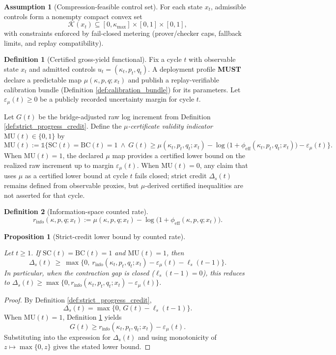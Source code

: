 \documentclass[11pt,a4paper]{article}
\newcommand{\MUST}{\textbf{MUST}}
\newcommand{\DependsOn}[1]{\par\noindent{\footnotesize\texttt{DependsOn: }\nolinkurl{#1}}\par}
\newcommand{\ind}{\mathds{1}}
\newcommand{\eps}{\varepsilon}
\newcommand{\cK}{\mathcal{K}}
\newtheorem{proposition}{Proposition}
\theoremstyle{definition}
\newtheorem{definition}{Definition}
\newtheorem{assumption}{Assumption}
\theoremstyle{remark}
\begin{document}
\begin{assumption}[Compression-feasible control set]\label{ass:compress}
For each state $x_t$, admissible controls form a nonempty compact convex set
\[
\cK(x_t)\subseteq [0,\kappa_{\max}]\times[0,1]\times[0,1],
\]
with constraints enforced by fail-closed metering (prover/checker caps, fallback limits, and replay compatibility).
\end{assumption}


\begin{definition}[Certified gross-yield functional]\label{def:mu}
Fix a cycle $t$ with observable state $x_t$ and admitted controls $u_t=(\kappa_t,p_t,q_t)$.
A deployment profile \MUST{} declare a predictable map $\mu(\kappa,p,q;x_t)$ and publish a replay-verifiable calibration bundle (Definition \ref{def:calibration_bundle}) for its parameters.
Let $\eps_\mu(t)\ge 0$ be a publicly recorded uncertainty margin for cycle $t$.

Let $G(t)$ be the bridge-adjusted raw log increment from Definition \ref{def:strict_progress_credit}.
Define the \emph{$\mu$-certificate validity indicator} $\mathrm{MU}(t)\in\{0,1\}$ by
\[
\mathrm{MU}(t):=
\ind\Big\{
\mathrm{SC}(t)=\mathrm{BC}(t)=1\ \wedge\
G(t)\ge \mu(\kappa_t,p_t,q_t;x_t)-\log\!\big(1+\phi_{\mathrm{eff}}(\kappa_t,p_t,q_t;x_t)\big)-\eps_\mu(t)
\Big\}.
\]
When $\mathrm{MU}(t)=1$, the declared $\mu$ map provides a certified lower bound on the realized raw increment up to margin $\eps_\mu(t)$.
When $\mathrm{MU}(t)=0$, any claim that uses $\mu$ as a certified lower bound at cycle $t$ fails closed; strict credit $\Delta_s(t)$ remains defined from observable proxies, but $\mu$-derived certified inequalities are not asserted for that cycle.
\end{definition}


\begin{definition}[Information-space counted rate]\label{def:information_space_counted_rate}
\[
r_{\mathrm{info}}(\kappa,p,q;x_t):=\mu(\kappa,p,q;x_t)-\log\!\big(1+\phi_{\mathrm{eff}}(\kappa,p,q;x_t)\big).
\]
\end{definition}


\begin{proposition}[Strict-credit lower bound by counted rate]\label{prop:strict_credit_lower_bound}
\DependsOn{global=foundation;refs=[]}
Let $t\ge 1$.
If $\mathrm{SC}(t)=\mathrm{BC}(t)=1$ and $\mathrm{MU}(t)=1$, then
\[
\Delta_s(t)\ \ge\ \max\{0,\ r_{\mathrm{info}}(\kappa_t,p_t,q_t;x_t)-\eps_\mu(t)-\ell_s(t-1)\}.
\]
In particular, when the contraction gap is closed ($\ell_s(t-1)=0$), this reduces to
$\Delta_s(t)\ge \max\{0,r_{\mathrm{info}}(\kappa_t,p_t,q_t;x_t)-\eps_\mu(t)\}$.
\end{proposition}
\begin{proof}
By Definition \ref{def:strict_progress_credit},
\[
\Delta_s(t)=\max\{0,\,G(t)-\ell_s(t-1)\}.
\]
When $\mathrm{MU}(t)=1$, Definition \ref{def:mu} yields
\[
G(t)\ge r_{\mathrm{info}}(\kappa_t,p_t,q_t;x_t)-\eps_\mu(t).
\]
Substituting into the expression for $\Delta_s(t)$ and using monotonicity of $z\mapsto\max\{0,z\}$ gives the stated lower bound.
\end{proof}
\end{document}
